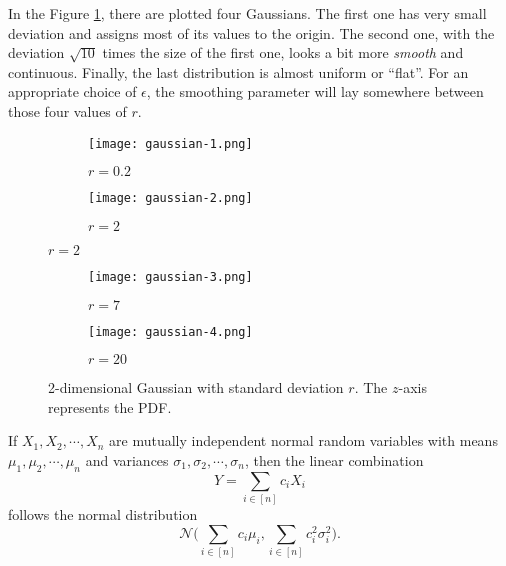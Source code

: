 In the Figure \ref{smoothing-1}, there are plotted four Gaussians. The first one has very small deviation and assigns most of its values to the origin. The second one, with the deviation $\sqrt{10}$ times the size of the first one, looks a bit more \textit{smooth} and continuous. Finally, the last distribution is almost uniform or ``flat''. For an appropriate choice of $\epsilon$, the smoothing parameter will lay somewhere between those four values of $r$.

\begin{figure}[ht]
        \centering
                \begin{subfigure}{.5\linewidth} 
                \centering
                \texttt{[image: gaussian-1.png]}
                \caption{$r = 0.2$}
        \end{subfigure}%
        \begin{subfigure}{.5\linewidth}
                \centering
                \texttt{[image: gaussian-2.png]}
                \caption{$r = 2$}
        \end{subfigure}
\end{figure}

\begin{figure}[h]
        \centering
                \begin{subfigure}{.5\linewidth} 
                \centering
                \texttt{[image: gaussian-3.png]}
                \caption{$r = 7$}
        \end{subfigure}%
        \begin{subfigure}{.5\linewidth}
                \centering
                \texttt{[image: gaussian-4.png]}
                \caption{$r = 20$}
        \end{subfigure}
        \caption{2-dimensional Gaussian with standard deviation $r$. The $z$-axis represents the PDF.}
        \label{smoothing-1}
\end{figure}
\begin{proposition}\label{gauss_sum}
If $X_1, X_2, \cdots, X_n$ are mutually independent normal random variables with means $\mu_1, \mu_2, \cdots, \mu_n$ and variances $\sigma_1, \sigma_2, \cdots, \sigma_n$, then the linear combination
\[ Y = \sum_{i \in [n]} c_i X_i \]
follows the normal distribution
\[ \mathcal{N}\biggl(\sum_{i \in [n]} c_i \mu_i, \sum_{i \in [n]} c^2_i \sigma^2_i\biggr). \]
\end{proposition}
